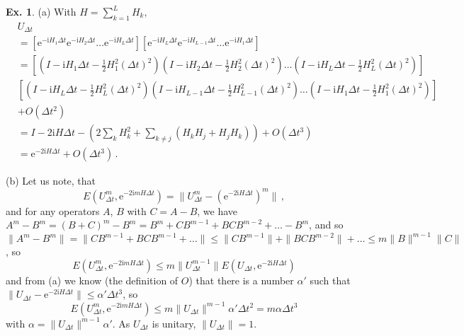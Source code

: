 \documentclass[a4paper,12pt]{article}
\def\e{\mathrm{e}}
\def\imagi{\mathrm{i}}
\theoremstyle{definition}
\newtheorem{exercise}{Ex.}[section]
\begin{document}
\begin{exercise}
 (a) With $H=\sum_{k=1}^L H_k$,
 \[
  \begin{aligned}
   &U_{\Delta t}\\
   &= \left[ \e^{-\imagi H_1 \Delta t}\e^{-\imagi H_2\Delta t}\dots \e^{-\imagi H_L\Delta t}\right]\left[ \e^{-\imagi H_L \Delta t}\e^{-\imagi H_{L-1}\Delta t}\dots \e^{-\imagi H_1\Delta t}\right]\\
   &= \left[\left( I - \imagi H_1 \Delta t-\frac{1}{2}H_1^2 (\Delta t)^2\right) \left( I - \imagi H_2 \Delta t-\frac{1}{2}H_2^2 (\Delta t)^2\right)\dots \left( I - \imagi H_L \Delta t-\frac{1}{2}H_L^2 (\Delta t)^2\right)\right]\\
   &\left[\left( I - \imagi H_L \Delta t-\frac{1}{2}H_L^2 (\Delta t)^2\right) \left( I - \imagi H_{L-1} \Delta t-\frac{1}{2}H_{L-1}^2 (\Delta t)^2\right)\dots \left( I - \imagi H_1 \Delta t-\frac{1}{2}H_1^2 (\Delta t)^2\right)\right]\\ &+O(\Delta t^2)\\
   &= I -2\imagi H \Delta t-\left( 2\sum_k H_k^2 + \sum_{k\ne j}(H_k H_j + H_j H_k)\right) + O(\Delta t^3)\\
   &= \e^{-2\imagi H \Delta t}+O(\Delta t^3)\,.
  \end{aligned}
 \]

 (b) Let us note, that
 \[
  E(U_{\Delta t}^m, \e^{-2\imagi m H \Delta t}) = \| U_{\Delta t}^m -  (\e^{-2\imagi H \Delta t})^m \|\,,
 \]
 and for any operators $A$, $B$ with $C=A-B$, we have $A^m - B^m = (B+C)^m - B^m = B^m + CB^{m-1} + BCB^{m-2}+\dots - B^m$, and so $\|A^m - B^m\| = \|C B^{m-1} + BCB^{m-1}+\dots\| \le \|C B^{m-1}\| + \| BCB^{m-2}\| + \dots \le m \|B\|^{m-1}\|C\|$, so
 \[
  E(U_{\Delta t}^m, \e^{-2\imagi m H \Delta t}) \le m \|U_{\Delta t}^{m-1}\| E(U_{\Delta t}, \e^{-2\imagi H \Delta t})
 \]
 and from (a) we know (the definition of $O$) that there is a number $\alpha'$ such that $\|U_{\Delta t} - \e^{-2\imagi H \Delta t}\| \le \alpha' \Delta t^3$, so
 \[
  E(U_{\Delta t}^m, \e^{-2\imagi m H \Delta t}) \le m \|U_{\Delta t}\|^{m-1}\alpha' \Delta t^2 = m\alpha \Delta t^3
 \]
 with $\alpha=\|U_{\Delta t}\|^{m-1}\alpha'$. As $U_{\Delta t}$ is unitary, $\|U_{\Delta t}\|=1$.
\end{exercise}
\end{document}
